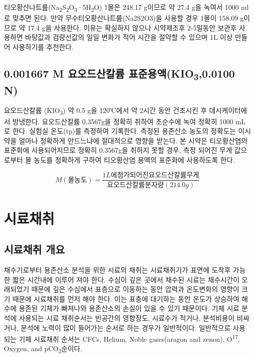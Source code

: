 \documentclass[
]{book}
\begin{document}
티오황산나트륨(Na\textsubscript{2}S\textsubscript{2}O\textsubscript{3}·5H\textsubscript{2}O) 1몰은 248.17 g이므로 약 27.4 g을 녹여서 1000 ml로 맞추면 된다. 만약 무수티오황산나트륨(Na2S2O3)을 사용할 경우 1몰이 158.09 g이므로 약 17.4 g을 사용한다. 이유는 확실하지 않으나 시약제조후 2-5일동안 보관후 사용하면 바탕값과 검량선값의 일일 변화가 적어 시간을 절약할 수 있으며 1L 이상 만들어 사용하기를 추천한다.

\hypertarget{m-uxc694uxc624uxb4dcuxc0b0uxce7cuxb968-uxd45cuxc900uxc6a9uxc561kio30.0100-n}{%
\section{\texorpdfstring{0.001667 M 요오드산칼륨 표준용액(KIO\textsubscript{3},0.0100 N)}{0.001667 M 요오드산칼륨 표준용액(KIO3,0.0100 N)}}\label{m-uxc694uxc624uxb4dcuxc0b0uxce7cuxb968-uxd45cuxc900uxc6a9uxc561kio30.0100-n}}

요오드산칼륨 (KIO\textsubscript{3}) 약 0.5 g을 120℃에서 약 2시간 동안 건조시킨 후 데시케이터에서 방냉한다. 요오드산칼륨 0.3567g을 정확히 취하여 초순수에 녹여 정확히 1000 mL로 한다. 실험실 온도(tp)를 측정하여 기록한다. 측정된 용존산소 농도의 정확도는 이시약을 얼마나 정확하게 만드느냐에 절대적으로 영향을 받는다. 본 시약은 티오황산염의 표준화에 사용되어지므로 정확히 0.3567g을 취하지 못할 경우, 측정 되어진 무게 값으로부터 몰 농도를 정확하게 구하여 티오황산염 용액의 표준화에 사용하도록 한다.

\[M (몰농도) =\frac{1L에 첨가되어진 요오드산칼륨 무게}{요오드산칼륨 분자량(214.0g)}\]

\hypertarget{uxc2dcuxb8ccuxcc44uxcde8}{%
\chapter{시료채취}\label{uxc2dcuxb8ccuxcc44uxcde8}}

\hypertarget{uxc2dcuxb8ccuxcc44uxcde8-uxac1cuxc694}{%
\section{시료채취 개요}\label{uxc2dcuxb8ccuxcc44uxcde8-uxac1cuxc694}}

채수기로부터 용존산소 분석을 위한 시료의 채취는 시료채취기가 표면에 도착후 가능한 짧은 시간내에 이루어 져야 한다. 수심이 깊은 곳에서 채수된 시료는 채수시간이 오래되었기 때문에 깊은 수심에서 표층으로 이동하는 동안 압력과 온도변화의 영향이 크기 때문에 시료채취를 먼저 해야 한다. 이는 표층에 대기하는 동안 온도가 상승하여 해수에 용존된 기체가 빠져나와 용존산소의 손실이 있을 수 있기 때문이다. 기체 시료 분석에 사용되는 시료 채취순서는 빈공간의 영향정도, 시료수가 적거나, 분석비용이 비싸거나, 분석에 노력이 많이 들어가는 순서로 하는 경우가 일반적이다. 일반적으로 사용되는 기체 시료채취 순서는 CFCs, Helium, Noble gases(aragon and zenon), O\textsuperscript{17}, Oxygen, and pCO\textsubscript{2}순이다.
\end{document}

